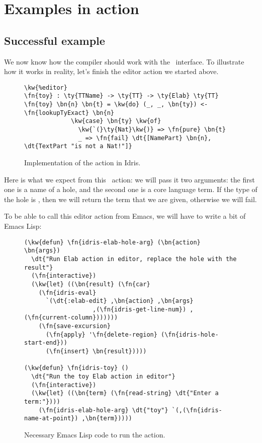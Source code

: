 \section{Examples in action}\label{sec:designExample}

\subsection{Successful example}

We now know how the compiler should work with the \Editorable\ interface.
To illustrate how it works in reality, let's finish the  editor action
we started above.

\begin{figure}[H]
\caption{Implementation of the  action in Idris.}
\begin{Verbatim}[framesep=2mm, label=\footnotesize{\normalfont{Idris}}, labelposition=topline]
\kw{%editor}
\fn{toy} : \ty{TTName} -> \ty{TT} -> \ty{Elab} \ty{TT}
\fn{toy} \bn{n} \bn{t} = \kw{do} (_, _, \bn{ty}) <- \fn{lookupTyExact} \bn{n}
             \kw{case} \bn{ty} \kw{of}
               \kw{`(}\ty{Nat}\kw{)} => \fn{pure} \bn{t}
               _ => \fn{fail} \dt{[NamePart} \bn{n}, \dt{TextPart "is not a Nat!"]}
\end{Verbatim}
\end{figure}

Here is what we expect from this \Elab\ action: we will pass it two arguments:
the first one is a name of a hole, and the second one is a core language term.
If the type of the hole is , then we will return the term that we are
given, otherwise we will fail.

To be able to call this editor action from Emacs, we will have to write a bit
of Emacs Lisp:

\begin{figure}[H]
\caption{Necessary Emacs Lisp code to run the  action.}
\label{code:elispToy}
\begin{Verbatim}[framesep=2mm, label=\footnotesize{\normalfont{Emacs Lisp}}, labelposition=topline]
(\kw{defun} \fn{idris-elab-hole-arg} (\bn{action} \bn{args})
  \dt{"Run Elab action in editor, replace the hole with the result"}
  (\fn{interactive})
  (\kw{let} ((\bn{result} (\fn{car}
    (\fn{idris-eval}
      `(\dt{:elab-edit} ,\bn{action} ,\bn{args}
                   ,(\fn{idris-get-line-num}) ,(\fn{current-column}))))))
    (\fn{save-excursion}
      (\fn{apply} '\fn{delete-region} (\fn{idris-hole-start-end}))
      (\fn{insert} \bn{result}))))

(\kw{defun} \fn{idris-toy} ()
  \dt{"Run the toy Elab action in editor"}
  (\fn{interactive})
  (\kw{let} ((\bn{term} (\fn{read-string} \dt{"Enter a term:"})))
    (\fn{idris-elab-hole-arg} \dt{"toy"} `(,(\fn{idris-name-at-point}) ,\bn{term}))))
\end{Verbatim}
\end{figure}

